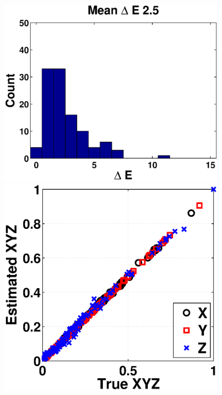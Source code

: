 \documentclass[]{spie}
\begin{document}
\begin{figure}[t]
\begin{center}
\begin{minipage}[b]{0.245\textwidth}
 \includegraphics[width=\textwidth,height=\textwidth]{Fig5/Hist15_Tungsten1_RGBW1_2}
 \includegraphics[width=\textwidth]{Fig5/XYZ_Tungsten1_RGBW1_2}

\end{minipage}
\end{center}
\end{figure}
\end{document}
